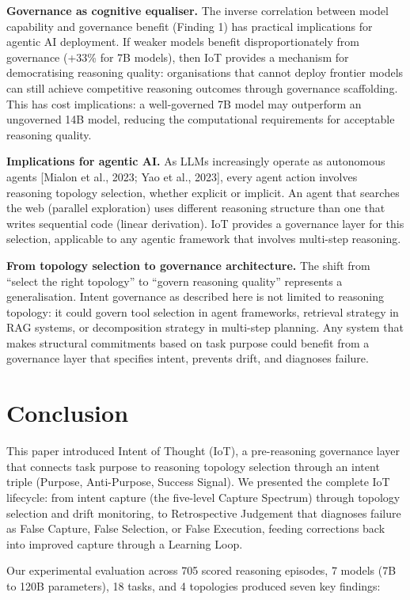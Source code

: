 \documentclass[11pt,a4paper]{article}
\begin{document}
\textbf{Governance as cognitive equaliser.} The inverse correlation
between model capability and governance benefit (Finding 1) has
practical implications for agentic AI deployment. If weaker models
benefit disproportionately from governance (+33\% for 7B models), then
IoT provides a mechanism for democratising reasoning quality:
organisations that cannot deploy frontier models can still achieve
competitive reasoning outcomes through governance scaffolding. This has
cost implications: a well-governed 7B model may outperform an ungoverned
14B model, reducing the computational requirements for acceptable
reasoning quality.

\textbf{Implications for agentic AI.} As LLMs increasingly operate as
autonomous agents {[}Mialon et al., 2023; Yao et al., 2023{]}, every
agent action involves reasoning topology selection, whether explicit or
implicit. An agent that searches the web (parallel exploration) uses
different reasoning structure than one that writes sequential code
(linear derivation). IoT provides a governance layer for this selection,
applicable to any agentic framework that involves multi-step reasoning.

\textbf{From topology selection to governance architecture.} The shift
from ``select the right topology'' to ``govern reasoning quality''
represents a generalisation. Intent governance as described here is not
limited to reasoning topology: it could govern tool selection in agent
frameworks, retrieval strategy in RAG systems, or decomposition strategy
in multi-step planning. Any system that makes structural commitments
based on task purpose could benefit from a governance layer that
specifies intent, prevents drift, and diagnoses failure.

\section{Conclusion}\label{conclusion}

This paper introduced Intent of Thought (IoT), a pre-reasoning
governance layer that connects task purpose to reasoning topology
selection through an intent triple (Purpose, Anti-Purpose, Success
Signal). We presented the complete IoT lifecycle: from intent capture
(the five-level Capture Spectrum) through topology selection and drift
monitoring, to Retrospective Judgement that diagnoses failure as False
Capture, False Selection, or False Execution, feeding corrections back
into improved capture through a Learning Loop.

Our experimental evaluation across 705 scored reasoning episodes, 7
models (7B to 120B parameters), 18 tasks, and 4 topologies produced
seven key findings:
\end{document}
